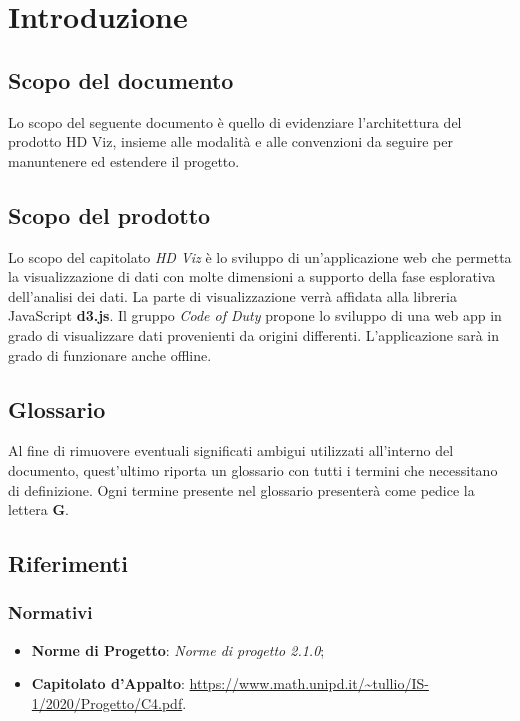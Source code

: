 \section{Introduzione}

    \subsection{Scopo del documento}
    Lo scopo del seguente documento è quello di evidenziare l'architettura del prodotto HD Viz, insieme alle modalità e alle convenzioni da seguire per manuntenere ed estendere il progetto.
    
    \subsection{Scopo del prodotto}
    Lo scopo del capitolato \emph{HD Viz} è lo sviluppo di un'applicazione web che permetta la visualizzazione di dati con molte dimensioni a supporto della fase esplorativa dell'analisi dei dati. La parte di visualizzazione verrà affidata alla libreria JavaScript \textbf{d3.js}. Il gruppo \emph{Code of Duty} propone lo sviluppo di una web app in grado di visualizzare dati provenienti da origini differenti. L'applicazione sarà in grado di funzionare anche offline.
    
    \subsection{Glossario}
    Al fine di rimuovere eventuali significati ambigui utilizzati all'interno del documento, quest'ultimo riporta un glossario con tutti i termini che necessitano di definizione. Ogni termine presente nel glossario presenterà come pedice la lettera \textbf{G}.
    
    \subsection{Riferimenti}
	\subsubsection{Normativi}
	\begin{itemize}
		\item \textbf{Norme di Progetto}: \textit{Norme di progetto 2.1.0};
        \item \textbf{Capitolato d'Appalto}: \url{https://www.math.unipd.it/~tullio/IS-1/2020/Progetto/C4.pdf}.
	\end{itemize}
